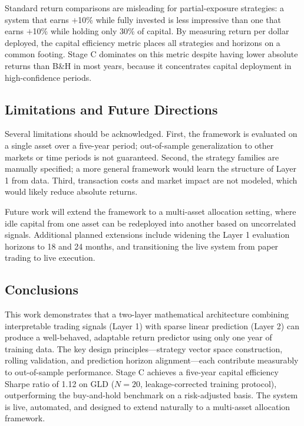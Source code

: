 \documentclass[11pt, letterpaper]{article}
\begin{document}
Standard return comparisons are misleading for partial-exposure strategies: a
system that earns $+$10\% while fully invested is less impressive than one
that earns $+$10\% while holding only 30\% of capital. By measuring return
per dollar deployed, the capital efficiency metric places all strategies and
horizons on a common footing. Stage C dominates on this metric despite having
lower absolute returns than B\&H in most years, because it concentrates
capital deployment in high-confidence periods.

\subsection{Limitations and Future Directions}

Several limitations should be acknowledged. First, the framework is evaluated
on a single asset over a five-year period; out-of-sample generalization to
other markets or time periods is not guaranteed. Second, the strategy families
are manually specified; a more general framework would learn the structure of
Layer 1 from data. Third, transaction costs and market impact are not modeled,
which would likely reduce absolute returns.

Future work will extend the framework to a multi-asset allocation setting,
where idle capital from one asset can be redeployed into another based on
uncorrelated signals. Additional planned extensions include widening the
Layer 1 evaluation horizons to 18 and 24 months, and transitioning the
live system from paper trading to live execution.

\subsection{Conclusions}

This work demonstrates that a two-layer mathematical architecture combining
interpretable trading signals (Layer 1) with sparse linear prediction (Layer
2) can produce a well-behaved, adaptable return predictor using only one year
of training data. The key design principles---strategy vector space
construction, rolling validation, and prediction horizon alignment---each
contribute measurably to out-of-sample performance. Stage C achieves a five-year capital efficiency Sharpe ratio of 1.12 on GLD
($N=20$, leakage-corrected training protocol),
outperforming the buy-and-hold benchmark on a risk-adjusted basis. The system
is live, automated, and designed to extend naturally to a multi-asset
allocation framework.
\end{document}
